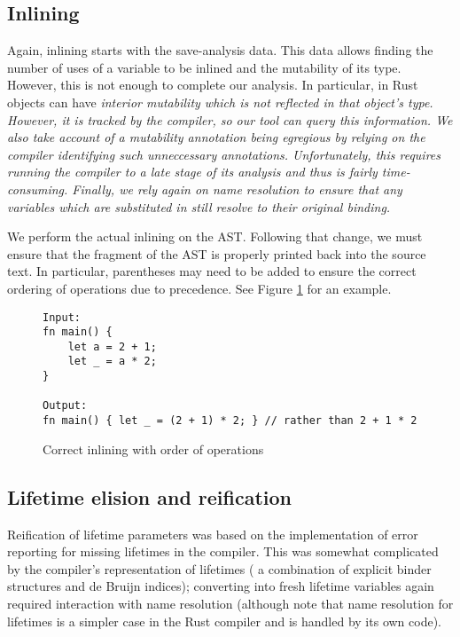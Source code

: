 \subsection{Inlining}

Again, inlining starts with the save-analysis data. This data allows finding the number of uses of a variable to be inlined and the mutability of its type. However, this is not enough to complete our analysis. In particular, in Rust objects can have \it{interior mutability} which is not reflected in that object's type. However, it is tracked by the compiler, so our tool can query this information. We also take account of a mutability annotation being egregious by relying on the compiler identifying such unneccessary annotations. Unfortunately, this requires running the compiler to a late stage of its analysis and thus is fairly time-consuming. Finally, we rely again on name resolution to ensure that any variables which are substituted in still resolve to their original binding.

We perform the actual inlining on the AST. Following that change, we must ensure that the fragment of the AST is properly printed back into the source text. In particular, parentheses may need to be added to ensure the correct ordering of operations due to precedence. See Figure \ref{Fig:exinline} for an example.

\begin{figure}[h]
\centering
\begin{verbatim}
Input:
fn main() {
    let a = 2 + 1;
    let _ = a * 2;
}

Output:
fn main() { let _ = (2 + 1) * 2; } // rather than 2 + 1 * 2
\end{verbatim}
\caption{Correct inlining with order of operations}
\label{Fig:exinline}
\end{figure}

\subsection{Lifetime elision and reification}

Reification of lifetime parameters was based on the implementation of error reporting for missing lifetimes in the compiler. This was somewhat complicated by the compiler's representation of lifetimes ( a combination of explicit binder structures and de Bruijn indices); converting into fresh lifetime variables again required interaction with name resolution (although note that name resolution for lifetimes is a simpler case in the Rust compiler and is handled by its own code).

